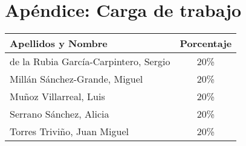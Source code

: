 \documentclass[12pt,a4paper,spanish,twoside]{book}
\begin{document}
% 

% 

% 

% 

\chapter*{Apéndice: Carga de trabajo}
\begin{center}
 \begin{tabular}{|p{10cm}|c|}\hline 
  Apellidos y Nombre & Porcentaje \\ \hline \hline
  de la Rubia García-Carpintero, Sergio & 20\% \\ \hline
  Millán Sánchez-Grande, Miguel & 20\% \\ \hline
  Muñoz Villarreal, Luis & 20\% \\ \hline
  Serrano Sánchez, Alicia & 20\% \\ \hline
  Torres Triviño, Juan Miguel & 20\% \\ \hline 
 \end{tabular}
\end{center}

%  
% 
\end{document}
